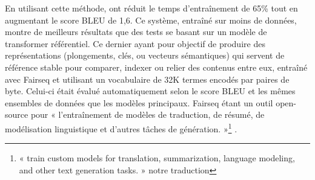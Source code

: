 En utilisant cette méthode, \citet{steingrimsson_2023} ont réduit le temps d'entraînement de 65\% tout 
en augmentant le score BLEU de 1,6. Ce système, entraîné sur moins de données, montre de meilleurs 
résultats que des tests se basant sur un modèle de transformer référentiel. Ce dernier ayant pour objectif de 
produire des représentations (plongements, clés, ou vecteurs sémantiques) qui servent de référence stable 
pour comparer, indexer ou relier des contenus entre eux, entraîné avec Fairseq \citep{ott_2019} et utilisant 
un vocabulaire de 32K termes encodés par paires de byte. 
Celui-ci était évalué automatiquement selon le score BLEU et les mêmes ensembles de données que les modèles 
principaux. Fairseq étant un outil open-source pour {« }l'entraînement de modèles de traduction, de résumé, 
de modélisation linguistique et d'autres tâches de génération. { »}\footnote{{« }train custom models for 
translation, summarization, language modeling, and other text generation tasks.{ »} \citep{ott_2019} 
notre traduction} \citep{ott_2019}.